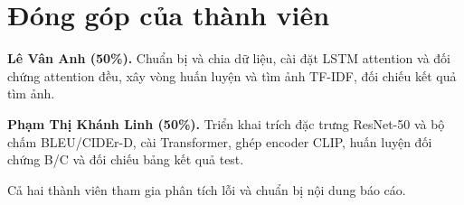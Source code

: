 \section*{Đóng góp của thành viên}

\textbf{Lê Vân Anh (50\%).} Chuẩn bị và chia dữ liệu, cài đặt LSTM attention và đối chứng attention đều, xây vòng huấn luyện và tìm ảnh TF-IDF, đối chiếu kết quả tìm ảnh.

\textbf{Phạm Thị Khánh Linh (50\%).} Triển khai trích đặc trưng ResNet-50 và bộ chấm BLEU/CIDEr-D, cài Transformer, ghép encoder CLIP, huấn luyện đối chứng B/C và đối chiếu bảng kết quả test.

Cả hai thành viên tham gia phân tích lỗi và chuẩn bị nội dung báo cáo.

